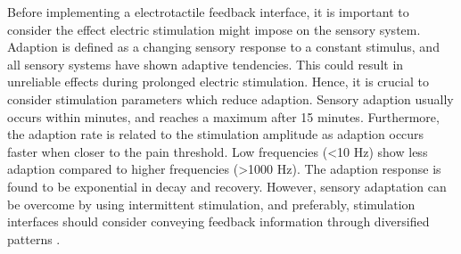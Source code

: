 Before implementing a electrotactile feedback interface, it is important to consider the effect electric stimulation might impose on the sensory system. \\
Adaption is defined as a changing sensory response to a constant stimulus, and all sensory systems have shown adaptive tendencies. This could result in unreliable effects during prolonged electric stimulation. Hence, it is crucial to consider stimulation parameters which reduce adaption. Sensory adaption usually occurs within minutes, and reaches a maximum after 15 minutes. Furthermore, the adaption rate is related to the stimulation amplitude as adaption occurs faster when closer to the pain threshold. Low frequencies (<10 Hz) show less adaption compared to higher frequencies (>1000 Hz). The adaption response is found to be exponential in decay and recovery. \cite{Buma2007,Szeto1982} 
However, sensory adaptation can be overcome by using intermittent stimulation, and preferably, stimulation interfaces should consider conveying feedback information through diversified patterns \cite{Szeto1982,Dosen2016}. 


